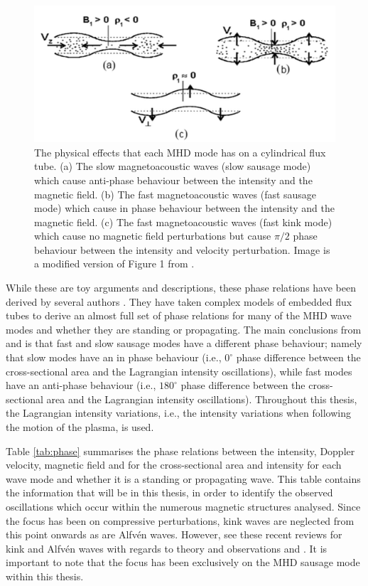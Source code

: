     \begin{figure}
    	\centering
    	\includegraphics[width=\textwidth]{tube}
    	\caption{
    		The physical effects that each MHD mode has on a  cylindrical flux tube.
    		(a) The slow magnetoacoustic waves (slow sausage mode) which cause anti-phase behaviour between the intensity and the magnetic field.
    		(b) The fast magnetoacoustic waves (fast sausage mode) which cause in phase behaviour between the intensity and the magnetic field.
    		(c) The fast magnetoacoustic waves (fast kink mode) which cause no magnetic field perturbations but cause $\pi/2$ phase behaviour between the intensity and velocity perturbation.
    		Image is a modified version of Figure 1 from \cite{CLOO}.
    	}
    	\label{fig:tube}
    \end{figure}
   
	While these are toy arguments and descriptions, these phase relations have been derived by several authors \citep{PMHDW,Moreels2013,Moreels2013b,2015A&A...579A..73M}.
    They have taken complex models of embedded flux tubes to derive an almost full set of phase relations for many of the MHD wave modes and whether they are standing or propagating.
	The main conclusions from \cite{Moreels2013} and \cite{Moreels2013b} is that fast and slow sausage modes have a different phase behaviour; namely that slow modes have an in phase behaviour (i.e., $0^\circ$  phase difference between the cross-sectional area and the Lagrangian intensity oscillations), while fast modes have an anti-phase behaviour (i.e., $180^\circ$ phase difference between the cross-sectional area and the Lagrangian intensity oscillations).
    Throughout this thesis, the Lagrangian intensity variations, i.e., the intensity variations when following the motion of the plasma, is used. 
     
    Table \ref{tab:phase} summarises the phase relations between the intensity, Doppler velocity, magnetic field and for the cross-sectional area and intensity for each wave mode and whether it is a standing or propagating wave.
    This table contains the information that will be in this thesis, in order to identify the observed oscillations which occur within the numerous magnetic structures analysed. 
    Since the focus has been on compressive perturbations, kink waves are neglected from this point onwards as are Alfv\'en waves.
    However, see these recent reviews for kink and Alfv\'en waves with regards to theory and observations \cite{Mathioudakis2013} and \cite{jess2015multiwavelength}.
    It is important to note that the focus has been exclusively on the MHD sausage mode within this thesis.
  
